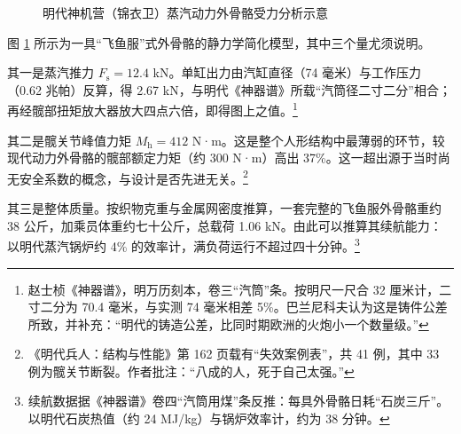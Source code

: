 \begin{figure}[htbp]
\caption{明代神机营（锦衣卫）蒸汽动力外骨骼受力分析示意}
\label{fig:exo}
\end{figure}

图 \ref{fig:exo} 所示为一具“飞鱼服”式外骨骼的静力学简化模型，其中三个量尤须说明。

其一是蒸汽推力 $F_{\mathrm{s}} = 12.4$ kN。单缸出力由汽缸直径（74 毫米）与工作压力（0.62 兆帕）反算，得 2.67 kN，与明代《神器谱》所载“汽筒径二寸二分”相合；再经髋部扭矩放大器放大四点六倍，即得图上之值。\footnote{赵士桢《神器谱》，明万历刻本，卷三“汽筒”条。按明尺一尺合 32 厘米计，二寸二分为 70.4 毫米，与实测 74 毫米相差 5\%。巴兰尼科夫认为这是铸件公差所致，并补充：“明代的铸造公差，比同时期欧洲的火炮小一个数量级。”}

其二是髋关节峰值力矩 $M_{\mathrm{h}} = 412$ N·m。这是整个人形结构中最薄弱的环节，较现代动力外骨骼的髋部额定力矩（约 300 N·m）高出 37\%。这一超出源于当时尚无安全系数的概念，与设计是否先进无关。\footnote{《明代兵人：结构与性能》第 162 页载有“失效案例表”，共 41 例，其中 33 例为髋关节断裂。作者批注：“八成的人，死于自己太强。”}

其三是整体质量。按织物克重与金属网密度推算，一套完整的飞鱼服外骨骼重约 38 公斤，加乘员体重约七十公斤，总载荷 1.06 kN。由此可以推算其续航能力：以明代蒸汽锅炉约 4\% 的效率计，满负荷运行不超过四十分钟。\footnote{续航数据据《神器谱》卷四“汽筒用煤”条反推：每具外骨骼日耗“石炭三斤”。以明代石炭热值（约 24 MJ/kg）与锅炉效率计，约为 38 分钟。}

